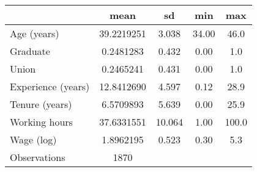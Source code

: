{
\def\sym#1{\ifmmode^{#1}\else\(^{#1}\)\fi}
\begin{tabular}{l*{1}{cccc}}
\hline\hline
                    &        mean&          sd&         min&         max\\
\hline
Age (years)         &  39.2219251&       3.038&       34.00&        46.0\\
Graduate            &   0.2481283&       0.432&        0.00&         1.0\\
Union               &   0.2465241&       0.431&        0.00&         1.0\\
Experience (years)  &  12.8412690&       4.597&        0.12&        28.9\\
Tenure (years)      &   6.5709893&       5.639&        0.00&        25.9\\
Working hours       &  37.6331551&      10.064&        1.00&       100.0\\
Wage (log)          &   1.8962195&       0.523&        0.30&         5.3\\
\hline
Observations        &        1870&            &            &            \\
\hline\hline
\end{tabular}
}
